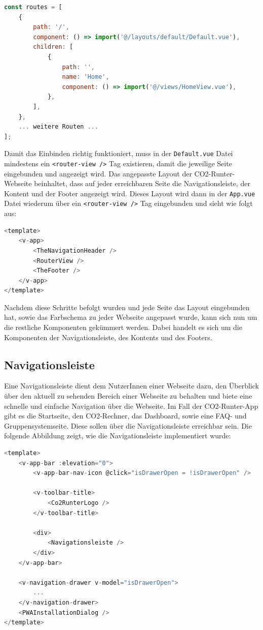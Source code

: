 \begin{lstlisting}[language={JavaScript}, caption={Einbindung des Layouts in der Vue Router Konfiguration}]
const routes = [
    {
        path: '/',
        component: () => import('@/layouts/default/Default.vue'),
        children: [
            {
                path: '',
                name: 'Home',
                component: () => import('@/views/HomeView.vue'),
            },
        ],
    },
    ... weitere Routen ...
];
\end{lstlisting}

Damit das Einbinden richtig funktioniert, muss in der \texttt{Default.vue} Datei mindestens ein \texttt{<router-view />} Tag existieren, damit die jeweilige Seite eingebunden und angezeigt wird.
Das angepasste Layout der CO2-Runter-Webseite beinhaltet, dass auf jeder erreichbaren Seite die Navigationsleiste, der Kontent und der Footer angezeigt wird.
Dieses Layout wird dann in der \texttt{App.vue} Datei wiederum über ein \texttt{<router-view />} Tag eingebunden und sieht wie folgt aus:

\begin{lstlisting}[language={JavaScript}, caption={Layout Definition}]
<template>
    <v-app>
        <TheNavigationHeader />
        <RouterView />
        <TheFooter />
    </v-app>
</template>
\end{lstlisting}

Nachdem diese Schritte befolgt wurden und jede Seite das Layout eingebunden hat, sowie das Farbschema zu jeder Webseite angepasst wurde, kann sich nun um die restliche Komponenten gekümmert werden.
Dabei handelt es sich um die Komponenten der Navigationsleiste, des Kontents und des Footers.

\subsection{Navigationsleiste}

Eine Navigationsleiste dient dem NutzerInnen einer Webseite dazu, den Überblick über den aktuell zu sehenden Bereich einer Webseite zu behalten und biete eine schnelle und einfache Navigation über die Webseite.
Im Fall der CO2-Runter-App gibt es die Startseite, den CO2-Rechner, das Dashboard, sowie eine FAQ- und Gruppensystemseite.
Diese sollen über die Navigationsleiste erreichbar sein.
Die folgende Abbildung zeigt, wie die Navigationsleiste implementiert wurde: \newpage

\begin{lstlisting}[language={JavaScript}, caption={Navigationsleiste für Web als auch Mobile}]
<template>
    <v-app-bar :elevation="0">
        <v-app-bar-nav-icon @click="isDrawerOpen = !isDrawerOpen" />

        <v-toolbar-title>
            <Co2RunterLogo />
        </v-toolbar-title>

        <div>
            <Navigationsleiste />
        </div>
    </v-app-bar>

    <v-navigation-drawer v-model="isDrawerOpen">
        ...
    </v-navigation-drawer>
    <PWAInstallationDialog />
</template>
\end{lstlisting}

